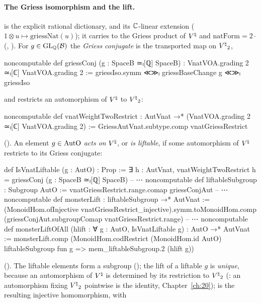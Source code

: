\paragraph{The Griess isomorphism and the lift.}   is the explicit
rational dictionary, and  its ${\mathbb{C}}$-linear extension
($1\otimes u\mapsto\mathrm{griessNat}(u)$); it carries  to the Griess product of ${V^{\natural}}$ and
$\mathrm{natForm}=2\cdot$ (, ).  For
$g\in\mathrm{GL}_{\mathbb{Q}}(\mathcal{B})$ the \emph{Griess conjugate} is the transported map on ${V^{\natural}}_2$,
\begin{leancode}
noncomputable def griessConj (g : SpaceB ≃ₗ[ℚ] SpaceB) :
    VnatVOA.grading 2 ≃ₗ[ℂ] VnatVOA.grading 2 :=
  griessIso.symm ≪≫ₗ griessBaseChange g ≪≫ₗ griessIso
\end{leancode}
and  restricts an automorphism of ${V^{\natural}}$ to ${V^{\natural}}_2$:
\begin{leancode}
noncomputable def vnatWeightTwoRestrict : AutVnat →* (VnatVOA.grading 2 ≃ₗ[ℂ] VnatVOA.grading 2) :=
  GriessAutVnat.subtype.comp vnatGriessRestrict
\end{leancode}
().  An element $g\in\mathrm{AutO}$ \emph{acts on}
${V^{\natural}}$, or \emph{is liftable}, if some automorphism of ${V^{\natural}}$ restricts to its Griess conjugate:
\begin{leancode}
def IsVnatLiftable (g : AutO) : Prop :=
  ∃ h : AutVnat, vnatWeightTwoRestrict h = griessConj (g : SpaceB ≃ₗ[ℚ] SpaceB)
-- ⋯
noncomputable def liftableSubgroup : Subgroup AutO :=
  vnatGriessRestrict.range.comap griessConjAut
-- ⋯
noncomputable def monsterLift : liftableSubgroup →* AutVnat :=
  (MonoidHom.ofInjective vnatGriessRestrict_injective).symm.toMonoidHom.comp
    (griessConjAut.subgroupComap vnatGriessRestrict.range)
-- ⋯
noncomputable def monsterLiftOfAll (hlift : ∀ g : AutO, IsVnatLiftable g) : AutO →* AutVnat :=
  monsterLift.comp (MonoidHom.codRestrict (MonoidHom.id AutO) liftableSubgroup
    fun g => mem_liftableSubgroup.2 (hlift g))
\end{leancode}
().  The liftable elements form a subgroup
(); the lift of a liftable $g$ is \emph{unique}, because an automorphism of ${V^{\natural}}$ is
determined by its restriction to ${V^{\natural}}_2$ (: an automorphism fixing
${V^{\natural}}_2$ pointwise is the identity, Chapter~\ref{ch:20});  is the resulting injective homomorphism, with
